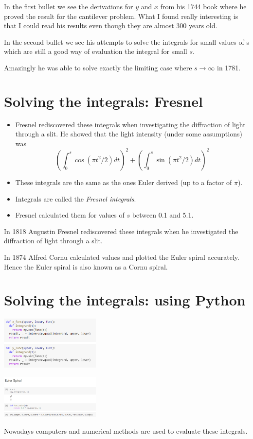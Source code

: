 \documentclass[]{article} %
\theoremstyle{definition}
\theoremstyle{theorem}
\begin{document}
In the first bullet we see the derivations for $y$ and $x$ from his 1744 book where he proved the result for the cantilever problem. What I found really interesting is that I could read his results even though they are almost 300 years old.

In the second bullet we see his attempts to solve the integrals for small values of s which are still a good way of evaluation the integral for small $s$.

Amazingly he was able to solve exactly the limiting case where $s \to \infty$ in 1781. 


\section{Solving the integrals: Fresnel}
\begin{tcolorbox}
	\begin{itemize}
		\item Fresnel rediscovered these integrals when investigating the diffraction of light through a slit. He showed that the light intensity (under some assumptions) was 
		\[
		\left( \int_{0}^{s}\cos \left( \pi t^2 / 2 \right) dt \right) ^2 + 
		\left( \int_{0}^{s}\sin \left( \pi t^2 / 2 \right) dt \right) ^2
		\] 
		\item These integrals are the same as the ones Euler derived (up to a factor of $\pi$).
		\item Integrals are called the \emph{Fresnel integrals}.
		\item Fresnel calculated them for values of $s$ between 0.1 and 5.1.
	\end{itemize}
\end{tcolorbox}

In 1818 Augustin Fresnel rediscovered these integrals when he investigated the diffraction of light through a slit. 

In 1874 Alfred Cornu calculated values and plotted the Euler spiral accurately. Hence the Euler spiral is also known as a Cornu spiral.


\section{Solving the integrals: using Python}
\begin{tcolorbox}
	\includegraphics[width=50mm, scale=0.5]{code_1.png}	
			
	\includegraphics[width=50mm, scale=0.5]{code_2.png}
	
	Nowadays computers and numerical methods are used to evaluate these integrals.
\end{tcolorbox}
\end{document}
